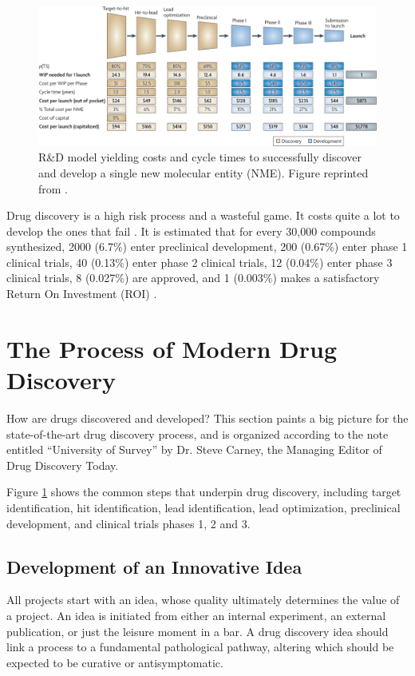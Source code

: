 \begin{figure}
\centering
\includegraphics[width=\textwidth]{Figures/DrugDiscoveryProcess.png}
\caption{R\&D model yielding costs and cycle times to successfully discover and develop a single new molecular entity (NME). Figure reprinted from \citep{716}.}
\label{fig:DrugDiscoveryProcess}
\end{figure}

Drug discovery is a high risk process and a wasteful game. It costs quite a lot to develop the ones that fail \citep{688}. It is estimated that for every 30,000 compounds synthesized, 2000 (6.7\%) enter preclinical development, 200 (0.67\%) enter phase 1 clinical trials, 40 (0.13\%) enter phase 2 clinical trials, 12 (0.04\%) enter phase 3 clinical trials, 8 (0.027\%) are approved, and 1 (0.003\%) makes a satisfactory Return On Investment (ROI) \citep{713}.

\section{The Process of Modern Drug Discovery}

How are drugs discovered and developed? This section paints a big picture for the state-of-the-art drug discovery process, and is organized according to the note entitled ``University of Survey'' by Dr. Steve Carney, the Managing Editor of Drug Discovery Today.

Figure \ref{fig:DrugDiscoveryProcess} \citep{716} shows the common steps that underpin drug discovery, including target identification, hit identification, lead identification, lead optimization, preclinical development, and clinical trials phases 1, 2 and 3.

\subsection{Development of an Innovative Idea}

All projects start with an idea, whose quality ultimately determines the value of a project. An idea is initiated from either an internal experiment, an external publication, or just the leisure moment in a bar. A drug discovery idea should link a process to a fundamental pathological pathway, altering which should be expected to be curative or antisymptomatic.

